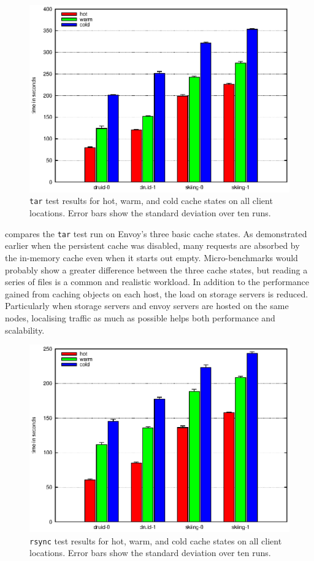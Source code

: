 \begin{figure}[t]
\centering
\includegraphics[width=\figwidth]{figures/envoy-tar}
\caption[The \texttt{tar} test with all cache modes]{\texttt{tar} test results for hot, warm, and cold cache states on all client locations. Error bars show the standard deviation over ten runs.}
\label{fig:envoy-tar}
\end{figure}

 compares the \texttt{tar} test run on Envoy's three basic cache states. As demonstrated earlier when the persistent cache was disabled, many requests are absorbed by the in-memory cache even when it starts out empty. Micro-benchmarks would probably show a greater difference between the three cache states, but reading a series of files is a common and realistic workload. In addition to the performance gained from caching objects on each host, the load on storage servers is reduced. Particularly when storage servers and envoy servers are hosted on the same nodes, localising traffic as much as possible helps both performance and scalability.

\begin{figure}[t]
\centering
\includegraphics[width=\figwidth]{figures/envoy-rsync}
\caption[The \texttt{rsync} test with all cache modes]{\texttt{rsync} test results for hot, warm, and cold cache states on all client locations. Error bars show the standard deviation over ten runs.}
\label{fig:envoy-rsync}
\end{figure}

